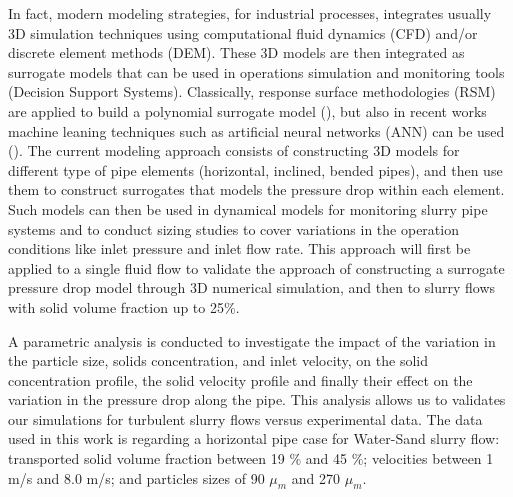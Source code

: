 \documentclass[11pt]{report}
\begin{document}
In fact,  modern modeling strategies, for industrial processes, integrates usually 3D simulation techniques using computational fluid dynamics (CFD) and/or discrete element methods (DEM). These 3D models are then integrated as surrogate models that can be used in operations simulation and monitoring tools (Decision Support Systems). Classically, response surface methodologies (RSM) are applied to build a polynomial surrogate model (\citet{Rabhi}), but also in recent works machine leaning techniques such as artificial neural networks (ANN) can be used (\citet{Seong}). The current modeling approach consists of  constructing 3D models for different type of pipe elements (horizontal, inclined, bended pipes), and then use them to construct surrogates that models the pressure drop within each element. Such models can then be used in dynamical models for monitoring slurry pipe systems and to conduct sizing studies to cover variations in the operation conditions like inlet pressure and inlet flow rate. This approach will first be applied to a single fluid flow to validate the approach of constructing a surrogate pressure drop model through 3D numerical simulation, and then to slurry flows with solid volume fraction up to 25\%. %

A parametric analysis is conducted to investigate the impact of the variation in the particle size, solids concentration, and inlet velocity, on the solid concentration profile, the solid velocity profile and finally their effect on the variation in the pressure drop along the pipe. This analysis allows us to validates our simulations for turbulent slurry flows versus experimental data. The data used in this work is regarding a horizontal pipe case for Water-Sand slurry flow: transported solid volume fraction between 19  $\%$ and 45 $\%$; velocities between 1 m/s and 8.0 m/s; and particles sizes of 90 $\mu_m$ and 270 $\mu_m$. 





\end{document}
